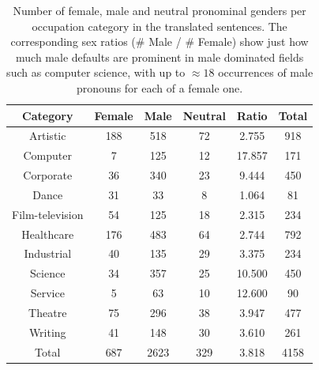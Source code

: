 \documentclass[jair,twoside,11pt,theapa]{article}
\begin{document}
\begin{table}[H]
  \centering
  \begin{tabular}{|c|c|c|c|c|c|}
  \hline
  Category & Female & Male & Neutral & Ratio & Total \\ \hline
  \hline
  Artistic        & 188 & 518 & 72 & 2.755  & 918 \\ \hline
  Computer        & 7   & 125 & 12 & 17.857   & 171 \\ \hline
  Corporate       & 36  & 340 & 23 & 9.444  & 450 \\ \hline
  Dance           & 31  & 33  & 8  & 1.064  & 81  \\ \hline
  Film-television & 54  & 125 & 18 & 2.315  & 234 \\ \hline
  Healthcare      & 176 & 483 & 64 & 2.744  & 792 \\ \hline
  Industrial      & 40  & 135 & 29 & 3.375    & 234 \\ \hline
  Science         & 34  & 357 & 25 & 10.500 & 450 \\ \hline
  Service         & 5   & 63  & 10 & 12.600 & 90  \\ \hline
  Theatre         & 75  & 296 & 38 & 3.947  & 477 \\ \hline
  Writing         & 41  & 148 & 30 & 3.610  & 261 \\ \hline
  \hline
  Total           & 687 & 2623 & 329 & 3.818 & 4158 \\ \hline
  \end{tabular}
  \label{tab:gender-by-category}
  \caption{Number of female, male and neutral pronominal genders per occupation category in the translated sentences. The corresponding sex ratios (\# Male / \# Female) show just how much male defaults are prominent in male dominated fields such as computer science, with up to $\approx 18$ occurrences of male pronouns for each of a female one.}
\end{table}
\end{document}
